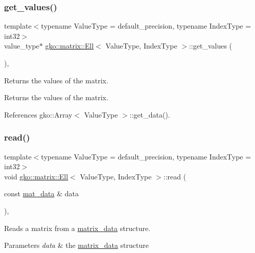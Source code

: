 \subsubsection{\texorpdfstring{get\+\_\+values()}{get\_values()}}
{\footnotesize\ttfamily template$<$typename Value\+Type = default\+\_\+precision, typename Index\+Type = int32$>$ \\
value\+\_\+type$\ast$ \hyperlink{classgko_1_1matrix_1_1Ell}{gko\+::matrix\+::\+Ell}$<$ Value\+Type, Index\+Type $>$\+::get\+\_\+values (\begin{DoxyParamCaption}{ }\end{DoxyParamCaption})\hspace{0.3cm}{\ttfamily [inline]}, {\ttfamily [noexcept]}}



Returns the values of the matrix. 

\begin{DoxyReturn}{Returns}
the values of the matrix. 
\end{DoxyReturn}


References gko\+::\+Array$<$ Value\+Type $>$\+::get\+\_\+data().

\mbox{\label{classgko_1_1matrix_1_1Ell_a2c877d9f7bbc57f97df5ab443954a6fd}} 
\subsubsection{\texorpdfstring{read()}{read()}}
{\footnotesize\ttfamily template$<$typename Value\+Type = default\+\_\+precision, typename Index\+Type = int32$>$ \\
void \hyperlink{classgko_1_1matrix_1_1Ell}{gko\+::matrix\+::\+Ell}$<$ Value\+Type, Index\+Type $>$\+::read (\begin{DoxyParamCaption}\item[{const \hyperlink{structgko_1_1matrix__data}{mat\+\_\+data} \&}]{data }\end{DoxyParamCaption})\hspace{0.3cm}{\ttfamily [override]}, {\ttfamily [virtual]}}



Reads a matrix from a \hyperlink{structgko_1_1matrix__data}{matrix\+\_\+data} structure. 


\begin{DoxyParams}{Parameters}
{\em data} & the \hyperlink{structgko_1_1matrix__data}{matrix\+\_\+data} structure \\
\hline
\end{DoxyParams}


